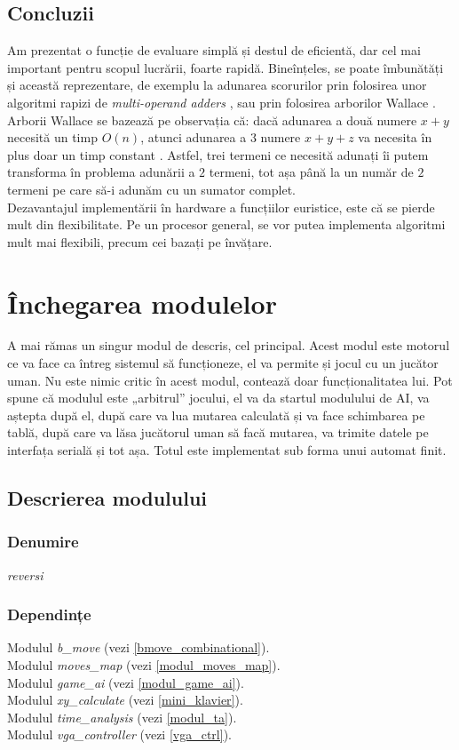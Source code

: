 \documentclass[12pt,twoside,a4paper,fleqn]{book}
\theoremstyle{definition}
\begin{document}
\subsection{Concluzii}
Am prezentat o funcție de evaluare simplă și destul de eficientă, dar cel mai important pentru scopul lucrării, foarte rapidă. Bineînțeles, se poate îmbunătăți și această reprezentare, de exemplu la adunarea scorurilor prin folosirea unor algoritmi rapizi de \emph{multi-operand adders} \cite{hwang}, sau prin folosirea arborilor Wallace  \cite{cormen} \cite{hwang}. Arborii Wallace se bazează pe observația că: dacă adunarea a două numere $x + y$ necesită un timp $O(n)$, atunci adunarea a $3$ numere $x + y + z$ va necesita în plus doar un timp constant \cite{cormen}. Astfel, trei termeni ce necesită adunați îi putem transforma în problema adunării a $2$ termeni, tot așa până la un număr de $2$ termeni pe care să-i adunăm cu un sumator complet.\\
Dezavantajul implementării în hardware a funcțiilor euristice, este că se pierde mult din flexibilitate. Pe un procesor general, se vor putea implementa algoritmi mult mai flexibili, precum cei bazați pe învățare.

\section{Închegarea modulelor}
A mai rămas un singur modul de descris, cel principal. Acest modul este motorul ce va face ca întreg sistemul să funcționeze, el va permite și jocul cu un jucător uman. Nu este nimic critic în acest modul, contează doar funcționalitatea lui. Pot spune că modulul este „arbitrul” jocului, el va da startul modulului de AI, va aștepta după el, după care va lua mutarea calculată și va face schimbarea pe tablă, după care va lăsa jucătorul uman să facă mutarea, va trimite datele pe interfața serială și tot așa. Totul este implementat sub forma unui automat finit.


\subsection{Descrierea modulului}
\subsubsection{Denumire}
\emph{reversi}

\subsubsection{Dependințe}
Modulul \emph{b\_move} (vezi \ref{bmove_combinational}).\\
Modulul \emph{moves\_map} (vezi \ref{modul_moves_map}).\\
Modulul \emph{game\_ai} (vezi \ref{modul_game_ai}).\\
Modulul \emph{xy\_calculate} (vezi \ref{mini_klavier}).\\
Modulul \emph{time\_analysis} (vezi \ref{modul_ta}).\\
Modulul \emph{vga\_controller} (vezi \ref{vga_ctrl}).\\
\end{document}
